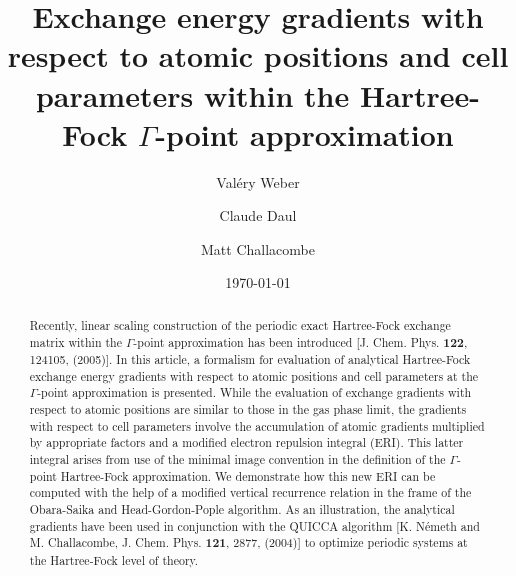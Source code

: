 \documentclass[prl,twocolumn,showpacs,twocolumngrid,superbib]{revtex4}
\begin{document}

\title{Exchange energy gradients with respect to atomic positions and cell parameters
  within the Hartree-Fock $\Gamma$-point approximation}

\author{Val\'ery Weber}
\author{Claude Daul}
%
\author{Matt Challacombe}%
%

\date{\today}%


\begin{abstract}
  Recently, linear scaling construction of the periodic exact Hartree-Fock exchange 
  matrix within the $\Gamma$-point approximation
  has been introduced   [J. Chem. Phys. {\bf 122}, 124105, (2005)].
  In this article, a formalism for evaluation of 
  analytical Hartree-Fock exchange energy gradients with respect to atomic positions and cell parameters at
  the $\Gamma$-point approximation is presented. While the evaluation of 
  exchange gradients with respect to atomic positions are similar to those in the gas phase limit, the 
  gradients with respect to cell parameters involve the accumulation of atomic gradients multiplied 
  by appropriate factors and a modified electron repulsion integral (ERI). This latter
  integral arises from use of the minimal image convention 
  in the definition of the $\Gamma$-point Hartree-Fock approximation. 
  We demonstrate how
  this new ERI can be computed with the help of a modified vertical 
  recurrence relation in the frame of the Obara-Saika and Head-Gordon-Pople 
  algorithm.  As an illustration, the analytical gradients have been used 
  in conjunction with the QUICCA algorithm [K. N\'emeth and M. Challacombe,
  J. Chem. Phys. {\bf 121}, 2877, (2004)] to optimize periodic 
  systems at the Hartree-Fock level of theory.
\end{abstract}

\maketitle
\end{document}
